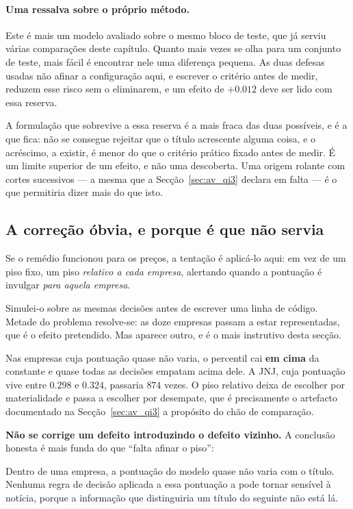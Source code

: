 \paragraph{Uma ressalva sobre o próprio método.} Este é mais um modelo avaliado sobre o mesmo
bloco de teste, que já serviu várias comparações deste capítulo. Quanto mais vezes se olha para um
conjunto de teste, mais fácil é encontrar nele uma diferença pequena. As duas defesas usadas
não afinar a configuração aqui, e escrever o critério antes de medir, reduzem esse risco
sem o eliminarem, e um efeito de $+0.012$ deve ser lido com essa reserva.

A formulação que sobrevive a essa reserva é a mais fraca das duas possíveis, e é a que fica: não se
consegue rejeitar que o título acrescente alguma coisa, e o acréscimo, a existir, é menor do que o
critério prático fixado antes de medir. É um limite superior de um efeito, e não uma descoberta.
Uma origem rolante com cortes sucessivos --- a mesma que a Secção~\ref{sec:av_qi3} declara em
falta --- é o que permitiria dizer mais do que isto.

\subsection{A correção óbvia, e porque é que não servia}

Se o remédio funcionou para os preços, a tentação é aplicá-lo aqui: em vez de um piso fixo, um piso
\emph{relativo a cada empresa}, alertando quando a pontuação é invulgar \emph{para aquela empresa}.

Simulei-o sobre as mesmas decisões antes de escrever uma linha de código. Metade do problema
resolve-se: as doze empresas passam a estar representadas, que é o efeito pretendido. Mas aparece
outro, e é o mais instrutivo desta secção.

Nas empresas cuja pontuação quase não varia, o percentil cai \textbf{em cima} da constante e quase
todas as decisões empatam acima dele. A JNJ, cuja pontuação vive entre $0.298$ e $0.324$, passaria
$874$ vezes. O piso relativo deixa de escolher por materialidade e passa a escolher por desempate,
que é precisamente o artefacto documentado na Secção~\ref{sec:av_qi3} a propósito do chão de
comparação.

\textbf{Não se corrige um defeito introduzindo o defeito vizinho.} A conclusão honesta é mais funda
do que ``falta afinar o piso'':

\begin{tcolorbox}[colback=black!3, colframe=black!35, boxrule=0.5pt, arc=2pt]
Dentro de uma empresa, a pontuação do modelo quase não varia com o título. Nenhuma regra de
decisão aplicada a essa pontuação a pode tornar sensível à notícia, porque a informação que
distinguiria um título do seguinte não está lá.
\end{tcolorbox}

